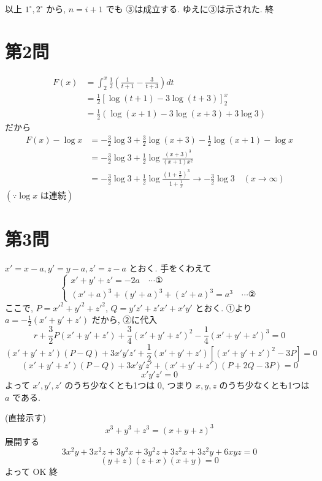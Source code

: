 \documentclass[../main.tex]{subfiles}
\begin{document}
以上 $1^\circ, 2^\circ$ から, $n=i+1$ でも ③は成立する. ゆえに③は示された. \hfill 終

\newpage

\section*{第2問}

\noindent
[\textbf{解}]
\begin{align*}
  F(x) &= \int_2^x \frac{1}{2}\left( \frac{1}{t+1} - \frac{3}{t+3} \right) dt \\
  &= \frac{1}{2} \left[ \log(t+1) - 3\log(t+3) \right]_2^x \\
  &= \frac{1}{2} \left( \log(x+1) - 3\log(x+3) + 3\log 3 \right)
\end{align*}
だから
\begin{align*}
  F(x) - \log x &= -\frac{3}{2}\log 3 + \frac{3}{2}\log(x+3) - \frac{1}{2}\log(x+1) - \log x \\
  &= -\frac{3}{2}\log 3 + \frac{1}{2}\log \frac{(x+3)^3}{(x+1)x^2} \\
  &= -\frac{3}{2}\log 3 + \frac{1}{2}\log \frac{(1 + \frac{3}{x})^3}{1 + \frac{1}{x}} \longrightarrow -\frac{3}{2}\log 3 \quad (x \to \infty)
\end{align*}
$(\because \log x \text{ は連続})$

\newpage

\section*{第3問}

\noindent
[\textbf{解}] $x' = x-a, y' = y-a, z' = z-a$ とおく. 手をくわえて
\[
  \begin{cases}
    x' + y' + z' = -2a \quad \cdots \text{①} \\
    (x'+a)^3 + (y'+a)^3 + (z'+a)^3 = a^3 \quad \cdots \text{②}
  \end{cases}
\]
ここで, $P = x'^2 + y'^2 + z'^2$, $Q = y'z' + z'x' + x'y'$ とおく. ①より $a = -\frac{1}{2}(x'+y'+z')$ だから, ②に代入
\[
  r + \frac{3}{2} P (x'+y'+z') + \frac{3}{4} (x'+y'+z')^2 - \frac{1}{4} (x'+y'+z')^3 = 0
\]
\[
  (x'+y'+z')(P-Q) + 3x'y'z' + \frac{1}{2}(x'+y'+z') [ (x'+y'+z')^2 - 3P ] = 0
\]
\[
  (x'+y'+z')(P-Q) + 3x'y'z' + (x'+y'+z')(P + 2Q - 3P) = 0
\]
\[
  x'y'z' = 0
\]
よって $x', y', z'$ のうち少なくとも1つは 0, つまり $x, y, z$ のうち少なくとも1つは $a$ である.

\bigskip
\noindent
[\textbf{解2}] (直接示す)
\[
  x^3 + y^3 + z^3 = (x+y+z)^3
\]
展開する
\[
  3x^2 y + 3x^2 z + 3y^2 x + 3y^2 z + 3z^2 x + 3z^2 y + 6xyz = 0
\]
\[
  (y+z)(z+x)(x+y) = 0
\]
よって OK \hfill 終
\end{document}
